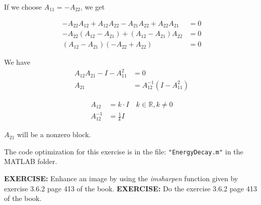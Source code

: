 If we choose $A_{11} = -A_{22}$, we get

\begin{align*}
-A_{22}A_{12} + A_{12}A_{22} - A_{21}A_{22} + A_{22}A_{21} &= 0 \\
-A_{22}(A_{12} - A_{21}) + (A_{12} - A_{21})A_{22} &= 0 \\
(A_{12} - A_{21})(-A_{22} + A_{22}) &= 0
\end{align*}

We have
\begin{align*}
A_{12}A_{21} - I - A_{11}^2 &= 0 \\
A_{21} &= A_{12}^{-1}(I - A_{11}^2)
\end{align*}

\begin{align*}
A_{12} &= k \cdot I \quad k \in \mathbb{R}, k \neq 0 \\
A_{12}^{-1} &= \frac{1}{k} I
\end{align*}

$A_{21}$ will be a nonzero block.

The code optimization for this exercise is in the file: \texttt{"EnergyDecay.m"} in the MATLAB folder.

\textbf{EXERCISE:} Enhance an image by using the \textit{imsharpen} function given by exercise 3.6.2 page 413 of the book.
\textbf{EXERCISE:} Do the exercise 3.6.2 page 413 of the book.